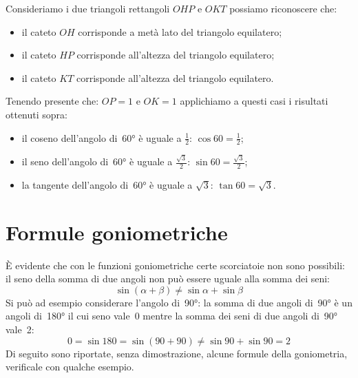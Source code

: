  \begin{minipage}{.45\textwidth}
  \begin{center}
\begin{inaccessibleblock}
    
\end{inaccessibleblock}
  \end{center}
 \end{minipage}
 \begin{minipage}{.45\textwidth}
Consideriamo i due triangoli rettangoli $OHP$ e $OKT$ possiamo riconoscere 
che:
\begin{itemize} [noitemsep]
 \item il cateto $OH$ corrisponde a metà lato del triangolo equilatero; 
 \item il cateto $HP$ corrisponde all'altezza del triangolo equilatero;
 \item il cateto $KT$ corrisponde all'altezza del triangolo equilatero.\\
\end{itemize}
 \end{minipage}


Tenendo presente che: $OP=1$ e $OK=1$ applichiamo a questi casi i risultati 
ottenuti sopra:
\begin{itemize} [noitemsep]
 \item il coseno dell'angolo di~60° è uguale a $\frac{1}{2}$: 
  $\cos 60 = \frac{1}{2}$; 
 \item il seno dell'angolo di~60° è uguale a $\frac{\sqrt{3}}{2}$: 
  $\sin 60 = \frac{\sqrt{3}}{2}$; 
 \item la tangente dell'angolo di~60° è uguale a $\sqrt{3}$: 
  $\tan 60 = \sqrt{3}$.
\end{itemize}


\section{Formule goniometriche}
\label{sec:gonio_formule}

È evidente che con le funzioni goniometriche certe scorciatoie non sono 
possibili: il seno della somma di due angoli non può essere uguale alla 
somma dei seni:
\vspace{-6pt}
\[\sin \left( \alpha + \beta \right) \ne \sin \alpha + \sin \beta\]
Si può ad esempio considerare l'angolo di~90°: la somma di due angoli di~90° 
è un angoli di~180° il cui seno vale~0 mentre la somma dei seni di  due 
angoli 
di~90° vale~2:
\vspace{-6pt}
\[0 = \sin 180 = \sin \left( 90 + 90 \right) \ne \sin 90 + \sin 90 = 2 \]
Di seguito sono riportate, senza dimostrazione, alcune formule della 
goniometria, verificale con qualche esempio.
\vspace{-6pt}


